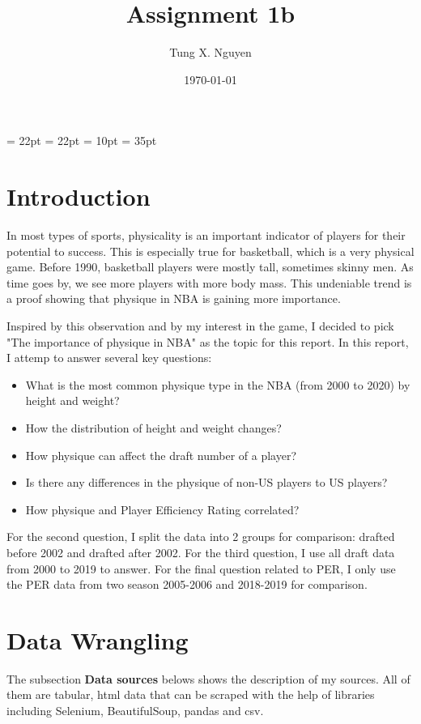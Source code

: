 \documentclass[a4paper,12pt,twoside]{article}
\title{Assignment 1b}
\author{Tung X. Nguyen}
\date{\today}
\numberwithin{equation}{section}
\begin{document}
\maketitle
\thispagestyle{empty}

\tableofcontents
\listoffigures
\thispagestyle{empty}


\oddsidemargin = 22pt
\evensidemargin = 22pt
\marginparsep = 10pt
\marginparwidth = 35pt


\section{Introduction}
In most types of sports, physicality is an important indicator of players for their potential to success. This is especially true for basketball, which is a very physical game. Before 1990, basketball players were mostly tall, sometimes skinny men. As time goes by, we see more players with more body mass. This undeniable trend is a proof showing that physique in NBA is gaining more importance.

Inspired by this observation and by my interest in the game, I decided to pick "The importance of physique in NBA" as the topic for this report. In this report, I attemp to answer several key questions:
\begin{itemize}
\item What is the most common physique type in the NBA (from 2000 to 2020) by height and weight?
\item How the distribution of height and weight changes?
\item How physique can affect the draft number of a player?
\item Is there any differences in the physique of non-US players to US players?
\item How physique and Player Efficiency Rating correlated?
\end{itemize}

For the second question, I split the data into 2 groups for comparison: drafted before 2002 and drafted after 2002. For the third question, I use all draft data from 2000 to 2019 to answer. For the final question related to PER, I only use the PER data from two season 2005-2006 and 2018-2019 for comparison.



\section{Data Wrangling}
The subsection \textbf{Data sources} belows shows the description of my sources. All of them are tabular, html data that can be scraped with the help of libraries including Selenium, BeautifulSoup, pandas and csv.
\end{document}
